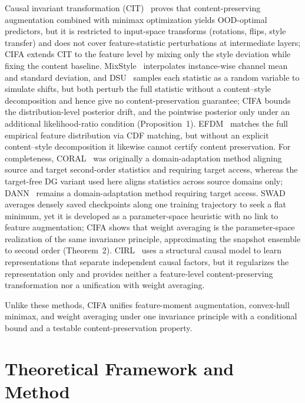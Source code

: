 \documentclass[electronics,article,submit,moreauthors]{Definitions/mdpi}
\newcommand{\add}[1]{\textcolor{addblue}{#1}}
\newcommand{\del}[1]{\textcolor{delred}{\st{#1}}}
\def\add#1{#1}
\def\del#1{}
\begin{document}
Causal invariant transformation (CIT)~\citep{ref22} proves that content-preserving augmentation combined with minimax optimization yields OOD-optimal predictors, but it is restricted to input-space transforms (rotations, flips, style transfer) and does not cover feature-statistic perturbations at intermediate layers; CIFA extends CIT to the feature level by mixing only the style deviation while fixing the content baseline. MixStyle~\citep{ref14} interpolates instance-wise channel mean and standard deviation, and DSU~\citep{ref15} samples each statistic as a random variable to simulate shifts, but both perturb the full statistic without a content--style decomposition and hence give no content-preservation guarantee; CIFA \del{bounds the resulting posterior drift}\add{bounds the distribution-level posterior drift, and the pointwise posterior only under an additional likelihood-ratio condition} (Proposition~1). EFDM~\citep{ref40} matches the full empirical feature distribution via CDF matching, but without an explicit content--style decomposition it likewise cannot certify content preservation. For completeness, CORAL~\citep{ref12} was originally a domain-adaptation method aligning source and target second-order statistics and requiring target access, whereas the target-free DG variant used here aligns statistics across source domains only; DANN~\citep{ref13} remains a domain-adaptation method requiring target access. SWAD~\citep{ref18} averages densely saved checkpoints along one training trajectory to seek a flat minimum, yet it is developed as a parameter-space heuristic with no link to feature augmentation; CIFA shows that weight averaging is the parameter-space realization of the same invariance principle, approximating the snapshot ensemble to second order (Theorem~2). CIRL~\citep{ref39} uses a structural causal model to learn representations that separate independent causal factors, but it regularizes the representation only and provides neither a feature-level content-preserving transformation nor a unification with weight averaging.

Unlike these methods, CIFA unifies feature-moment augmentation, convex-hull minimax, and weight averaging under one invariance principle with a conditional bound and a testable content-preservation property.

\section{Theoretical Framework and Method}
\end{document}
